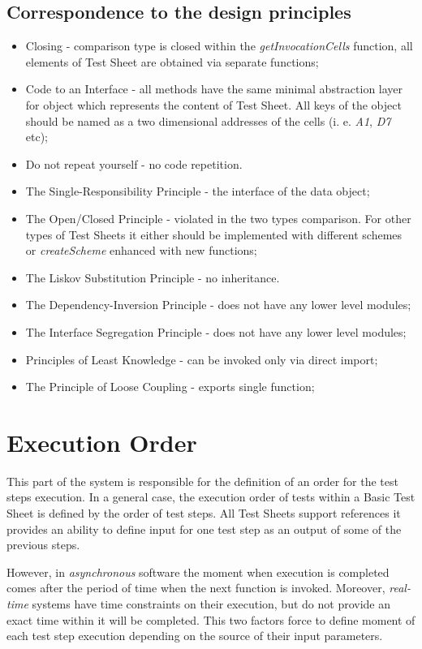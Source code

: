 \subsection{Correspondence to the  design principles}
\begin{itemize}
	\item Closing - comparison type is closed within the \textit{getInvocationCells} function, all elements of Test Sheet are obtained via separate functions;
	\item Code to an Interface - all methods have the same minimal abstraction layer for object which represents the content of Test Sheet. All keys of the object should be named as a two dimensional addresses of the cells (i. e. \textit{A1}, \textit{D7} etc);
	\item Do not repeat yourself - no code repetition.
	\item The Single-Responsibility Principle - the interface of the data object;
	\item The Open/Closed Principle - violated in the two types comparison. For other types of Test Sheets it either should be implemented with different schemes or \textit{createScheme} enhanced with new functions;
	\item The Liskov Substitution Principle - no inheritance.
	\item The Dependency-Inversion Principle - does not have any lower level modules;
	\item The Interface Segregation Principle - does not have any lower level modules;
	\item Principles of Least Knowledge - can be invoked only via direct import;
	\item The Principle of Loose Coupling - exports single function;
\end{itemize}

\section{Execution Order}
\label{sec:execOrder}
This part of the system is responsible for the definition of an order for the test steps execution. In a general case, the execution order of tests within a Basic Test Sheet is defined by the order of test steps. 
All Test Sheets support references it provides an ability to define input for one test step as an output of some of the previous steps.


However, in \textit{asynchronous} software the moment when execution is completed comes after the period of time when the next function is invoked. Moreover, \textit{real-time} systems have time constraints on their execution, but do not provide an exact time within it will be completed. This two factors force to define moment of each test step execution depending on the source of their input parameters. 


